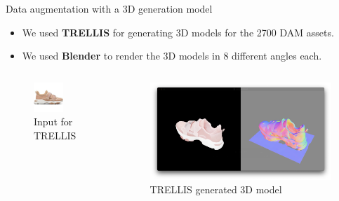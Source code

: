 \documentclass{beamer}
\begin{document}
\begin{frame}{Data augmentation with a 3D generation model}
    \begin{itemize}
        \item We used \textbf{TRELLIS} for generating 3D models for the 2700 DAM assets.
        \item We used \textbf{Blender} to render the 3D models in 8 different angles each.
    \end{itemize}
    
    \begin{columns}
        \begin{figure}
            \includegraphics[width=0.65\textwidth]{assets/trellis_input.png}
            \caption{Input for TRELLIS}
        \end{figure}
        \begin{figure}
            \includegraphics[width=1\textwidth]{assets/trellis_output.png}
            \caption{TRELLIS generated 3D model}
        \end{figure}
    \end{columns}
    
\end{frame}
\end{document}
